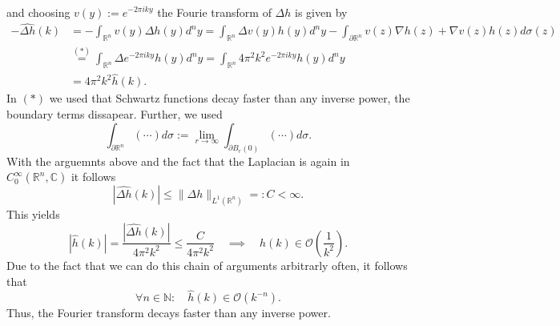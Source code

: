 \documentclass[A4,12pt,twoside]{book}
\begin{document}
{\begin{align*}
    \end{align*}
    and choosing $v(y):= e^{-2 \pi iky}$ the Fourie transform of $\Delta h$ is given by 
    \begin{align*}
        - \hat{\Delta h}(k)& = - \int_{\mathbb{R}^n} v(y) \Delta h(y) d^n y = \int_{\mathbb{R}^n} \Delta v(y) h(y) d^n y - \int_{\partial \mathbb{R}^n} v(z) \nabla h(z) + \nabla v(z) h(z) d \sigma (z) \\
        &\stackrel{(*)}{=} \int_{\mathbb{R}^n} \Delta e^{- 2 \pi iky} h(y) d^n y = \int_{\mathbb{R}^n } 4 \pi^2 k^2 e^{- 2 \pi iky} h(y) d^n y \\
        &= 4 \pi^2 k^2 \hat{h}(k).
    \end{align*}
    In $(*)$ we used that Schwartz functions decay faster than any inverse power, the boundary terms dissapear. Further, we used 
    \[
    \int_{\partial \mathbb{R}^n} (\cdots)d \sigma := \lim_{r \to \infty} \int_{\partial B_r (0)} (\cdots) d \sigma.
    \]
    With the arguemnts above and the fact that the Laplacian is again in $C_0^\infty (\mathbb{R}^n , \mathbb{C})$ it follows 
    \[
    |\hat{\Delta h} (k)|  \leq \| \Delta h \|_{L^1 (\mathbb{R}^n)} =: C < \infty.
    \]
    This yields
    \[
    |\hat{h}(k)| =  \frac{|\hat{\Delta h} (k)| }{4 \pi^2 k^2} \leq \frac{C}{4 \pi^2 k^2} \quad \implies \quad \hat{h} (k) \in \mathcal{O}(\frac{1}{k^2}).
    \]
    Due to the fact that we can do this chain of arguments arbitrarly often, it follows that 
    \[
   \forall n \in \mathbb{N}: \quad \hat{h}(k) \in \mathcal{O}(k^{-n}).
    \]
    Thus, the Fourier transform decays faster than any inverse power.
    
}
\end{document}
